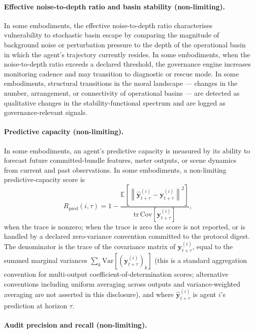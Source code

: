 \documentclass[a4paper,12pt]{article}
\begin{document}
\paragraph{Effective noise-to-depth ratio and basin stability
(non-limiting).}
In some embodiments, the effective noise-to-depth ratio characterises
vulnerability to stochastic basin escape by comparing the magnitude of
background noise or perturbation pressure to the depth of the
operational basin in which the agent's trajectory currently resides.
In some embodiments, when the noise-to-depth ratio exceeds a declared
threshold, the governance engine increases monitoring cadence and may
transition to diagnostic or rescue mode. In some embodiments,
structural transitions in the moral landscape --- changes in the
number, arrangement, or connectivity of operational basins --- are
detected as qualitative changes in the stability-functional spectrum
and are logged as governance-relevant signals.

\paragraph{Predictive capacity (non-limiting).}

In some embodiments, an agent's predictive capacity is measured by its
ability to forecast future committed-bundle features, meter outputs, or
scene dynamics from current and past observations. In some embodiments,
a non-limiting predictive-capacity score is
\[
  R_{\mathrm{pred}}(i,\tau)
  =
  1 - \frac{
    \mathbb{E}\!\left[\left\|
      \hat{\mathbf{y}}^{(i)}_{t+\tau} - \mathbf{y}^{(i)}_{t+\tau}
    \right\|^2\right]}{
    \mathrm{tr}\,\mathrm{Cov}[\mathbf{y}^{(i)}_{t+\tau}]},
\]
when the trace is nonzero; when the trace is zero the score is not
reported, or is handled by a declared zero-variance convention committed
to the protocol digest. The denominator is the trace of the covariance
matrix of $\mathbf{y}^{(i)}_{t+\tau}$, equal to the summed marginal
variances $\sum_k \mathrm{Var}\!\left[(\mathbf{y}^{(i)}_{t+\tau})_k\right]$ (this is a standard
aggregation convention for multi-output coefficient-of-determination
scores; alternative conventions including uniform averaging across
outputs and variance-weighted averaging are not asserted in this
disclosure), and
where $\hat{\mathbf{y}}^{(i)}_{t+\tau}$ is agent $i$'s prediction at
horizon $\tau$.

\paragraph{Audit precision and recall (non-limiting).}
\end{document}

